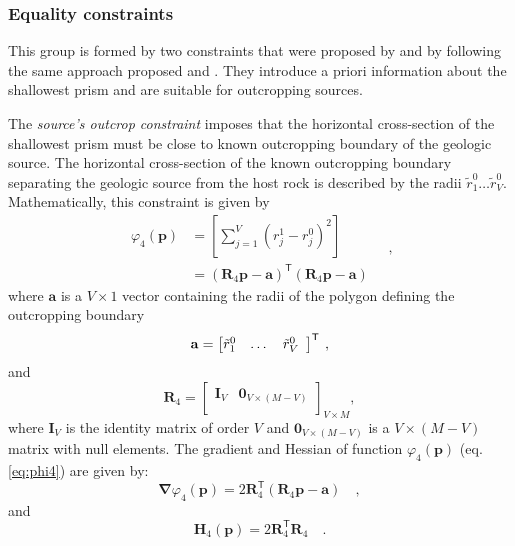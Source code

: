 \subsubsection{Equality constraints}

This group is formed by two constraints that were proposed by \cite{oliveirajr-etal2011} and \cite{oliveirajr-barbosa2013} by following the same approach proposed \cite{barbosa-etal1997} and \cite{barbosa-1999a}. 
They introduce a priori information about the shallowest prism and are  suitable for outcropping sources.

The \textit{source’s outcrop constraint} imposes that the horizontal cross-section of the shallowest prism must be close to known outcropping boundary of the geologic source.
The horizontal cross-section of the known outcropping boundary separating the geologic  source from the host rock is described by the radii $\tilde{r}_{1}^{0} \dots \tilde{r}_{V}^{0}$. Mathematically, this constraint is given by
\begin{equation}\label{eq:phi4}
\begin{split}
\varphi_{4}(\mathbf{p}) &= \left[ \sum\limits^{V}_{j=1}\left(r^{1}_{j}-r^{0}_{j}\right)^2\right] \\
&= \left(\mathbf{R}_{4} \mathbf{p} - \mathbf{a} \right)^{\mathsf{T}} 
\left(\mathbf{R}_{4} \mathbf{p} - \mathbf{a} \right)
\end{split} \quad ,
\end{equation}
where $\mathbf{a}$ is a $V \times 1$ vector containing the radii of the polygon defining the outcropping boundary
\begin{equation}
\mathbf{a} = \left[ \begin{array}{@{}*{12}{c}@{}}
\tilde{r}_{1}^{0} & \dots & \tilde{r}_{V}^{0}  \\
\end{array} \right]^{\mathsf{T}} \: ,
\label{eq:a-vector}
\end{equation}
and
\begin{equation}
\mathbf{R}_{4} = 
\begin{bmatrix}
\mathbf{I}_{V} & \mathbf{0}_{V \times (M-V)} \\
\end{bmatrix}_{V\times M},
\label{eq:R4-matrix}
\end{equation}
where $\mathbf{I}_{V}$ is the identity matrix of order $V$ and 
$\mathbf{0}_{V \times (M-V)}$ is a $V \times (M-V)$ matrix with null elements.
The gradient and Hessian of function $\varphi_{4}(\mathbf{p})$ (eq. \ref{eq:phi4}) are given by:
\begin{equation}\label{eq:phi4_grad}
\boldsymbol{\nabla}\varphi_{4}(\mathbf{p}) = 2 \mathbf{R}_{4}^{\mathsf{T}} 
\left(\mathbf{R}_{4} \mathbf{p} - \mathbf{a} \right) \quad ,
\end{equation}
and
\begin{equation}\label{eq:phi4_hessian}
\mathbf{H}_{4}(\mathbf{p}) = 2 \mathbf{R}^{\mathsf{T}}_{4}\mathbf{R}_{4} \quad .
\end{equation}

